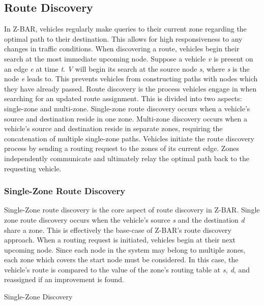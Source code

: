 \documentclass[conference]{IEEEtran}
\begin{document}
\subsection{Route Discovery}

In Z-BAR, vehicles regularly make queries to their current zone regarding the optimal path to their destination. This allows for high responsiveness to any changes in traffic conditions. When discovering a route, vehicles begin their search at the most immediate upcoming node. Suppose a vehicle \textit{v} is present on an edge \textit{e} at time \textit{t}. \textit{V} will begin its search at the source node \textit{s}, where \textit{s} is the node \textit{e} leads to. This prevents vehicles from constructing paths with nodes which they have already passed. Route discovery is the process vehicles engage in when searching for an updated route assignment. This is divided into two aspects: single-zone and multi-zone. Single-zone route discovery occurs when a vehicle's source and destination reside in one zone. Multi-zone discovery occurs when a vehicle's source and destination reside in separate zones, requiring the concatenation of multiple single-zone paths. Vehicles initiate the route discovery process by sending a routing request to the zones of its current edge. Zones independently communicate and ultimately relay the optimal path back to the requesting vehicle.

\subsubsection{Single-Zone Route Discovery}

Single-Zone route discovery is the core aspect of route discovery in Z-BAR. Single zone route discovery occurs when the vehicle's source \textit{s} and the destination \textit{d} share a zone. This is effectively the base-case of Z-BAR's route discovery approach. When a routing request is initiated, vehicles begin at their next upcoming node. Since each node in the system may belong to multiple zones, each zone which covers the start node must be considered. In this case, the vehicle's route is compared to the value of the zone's routing table at \textit{s, d}, and reassigned if an improvement is found.

\begin{algorithm}[H]
  \caption{Single-Zone Discovery}
  \label{route_discovery_single_zone}
  \begin{algorithmic}[1]
  \EndProcedure
  \end{algorithmic}
\end{algorithm}
\end{document}
